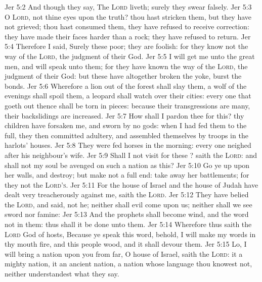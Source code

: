 \vs Jer 5:2 And though they say, The \textsc{Lord} liveth; surely they swear falsely.
\vs Jer 5:3 O \textsc{Lord},  not thine eyes upon the truth? thou hast stricken them, but they have not grieved; thou hast consumed them,  they have refused to receive correction: they have made their faces harder than a rock; they have refused to return.
\vs Jer 5:4 Therefore I said, Surely these  poor; they are foolish: for they know not the way of the \textsc{Lord},  the judgment of their God.
\vs Jer 5:5 I will get me unto the great men, and will speak unto them; for they have known the way of the \textsc{Lord},  the judgment of their God: but these have altogether broken the yoke,  burst the bonds.
\vs Jer 5:6 Wherefore a lion out of the forest shall slay them,  a wolf of the evenings shall spoil them, a leopard shall watch over their cities: every one that goeth out thence shall be torn in pieces: because their transgressions are many,  their backslidings are increased.
\vs Jer 5:7 How shall I pardon thee for this? thy children have forsaken me, and sworn by  no gods: when I had fed them to the full, they then committed adultery, and assembled themselves by troops in the harlots' houses.
\vs Jer 5:8 They were  fed horses in the morning: every one neighed after his neighbour's wife.
\vs Jer 5:9 Shall I not visit for these ? saith the \textsc{Lord}: and shall not my soul be avenged on such a nation as this?
\vs Jer 5:10 Go ye up upon her walls, and destroy; but make not a full end: take away her battlements; for they  not the \textsc{Lord's}.
\vs Jer 5:11 For the house of Israel and the house of Judah have dealt very treacherously against me, saith the \textsc{Lord}.
\vs Jer 5:12 They have belied the \textsc{Lord}, and said,  not he; neither shall evil come upon us; neither shall we see sword nor famine:
\vs Jer 5:13 And the prophets shall become wind, and the word  not in them: thus shall it be done unto them.
\vs Jer 5:14 Wherefore thus saith the \textsc{Lord} God of hosts, Because ye speak this word, behold, I will make my words in thy mouth fire, and this people wood, and it shall devour them.
\vs Jer 5:15 Lo, I will bring a nation upon you from far, O house of Israel, saith the \textsc{Lord}: it  a mighty nation, it  an ancient nation, a nation whose language thou knowest not, neither understandest what they say.
